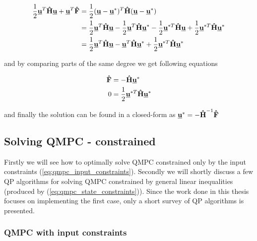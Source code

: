 \begin{equation}
\begin{split}
\frac{1}{2}\textbf{\underline{u}}^T\textbf{\^H}\textbf{\underline{u}} + \textbf{\underline{u}}^T\textbf{\^F} &= \frac{1}{2}(\textbf{\underline{u}} - \textbf{\underline{u}}^*)^T\textbf{\^H}(\textbf{\underline{u}} - \textbf{\underline{u}}^*)\\
&= \frac{1}{2}\textbf{\underline{u}}^T\textbf{\^H}\textbf{\underline{u}} - \frac{1}{2}\textbf{\underline{u}}^T\textbf{\^H}\textbf{\underline{u}}^* - \frac{1}{2}\textbf{\underline{u}}^{*T}\textbf{\^H}\textbf{\underline{u}} + \frac{1}{2}\textbf{\underline{u}}^{*T}\textbf{\^H}\textbf{\underline{u}}^* \\
&= \frac{1}{2}\textbf{\underline{u}}^T\textbf{\^H}\textbf{\underline{u}} -
\textbf{\underline{u}}^T\textbf{\^H}\textbf{\underline{u}}^* + \frac{1}{2}\textbf{\underline{u}}^{*T}\textbf{\^H}\textbf{\underline{u}}^*
\end{split}
\end{equation}

and by comparing parts of the same degree we get following equations

\begin{equation}
\begin{split}
\textbf{\^F} &= -\textbf{\^H}\textbf{\underline{u}}^* \\
0 &= \frac{1}{2}\textbf{\underline{u}}^{*T}\textbf{\^H}\textbf{\underline{u}}^*
\end{split}
\end{equation}

and finally the solution can be found in a closed-form as $\textbf{\underline{u}}^* = -\textbf{\^H}^{-1}\textbf{\^F}$

\subsection{Solving QMPC - constrained}
\label{cap:qmpc_constrained}

Firstly we will see how to optimally solve QMPC constrained only by the input constraints (\ref{eq:qmpc_input_constraints}). Secondly we will shortly discuss a few QP algorithms for solving QMPC constrained by general linear inequalities (produced by (\ref{eq:qmpc_state_constraints})). Since the work done in this thesis focuses on implementing the first case, only a short survey of QP algorithms is presented.

\subsubsection{QMPC with input constraints}

